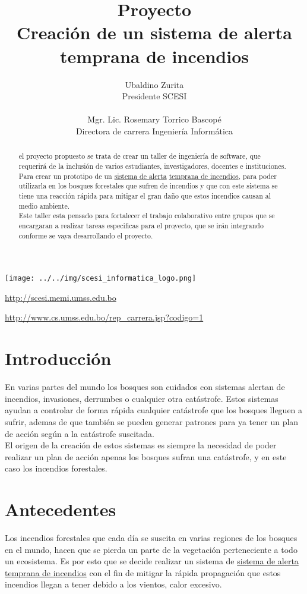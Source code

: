 \documentclass[letter,12pt]{article}
\title{Proyecto\\ Creación de un sistema de alerta temprana de incendios}
\author{Ubaldino Zurita\\{\normalsize Presidente SCESI}\\\\Mgr. Lic. Rosemary Torrico Bascopé\\{\normalsize Directora de carrera Ingeniería Informática}}
\begin{document}
\maketitle
\begin{center}
    \texttt{[image: ../../img/scesi\_informatica\_logo.png]} 
\end{center}
\begin{center}
    \url {http://scesi.memi.umss.edu.bo}\\
\end{center}
\begin{center}
    \url{http://www.cs.umss.edu.bo/rep_carrera.jsp?codigo=1}
\end{center}
\pagebreak
\tableofcontents
\pagebreak
\begin{abstract}
el proyecto propuesto se trata de crear un taller de ingeniería de software, que requerirá de la inclusión de varios estudiantes, investigadores, docentes e instituciones. Para crear un prototipo de un \underline{sistema de alerta} \underline{temprana de incendios}, para poder utilizarla en los bosques forestales que sufren de incendios y que con este sistema se tiene una reacción rápida para mitigar el gran daño que estos incendios causan al medio ambiente.\\
Este taller esta pensado para fortalecer el trabajo colaborativo entre grupos que se encargaran a realizar tareas especificas para el proyecto, que se irán integrando conforme se vaya desarrollando el proyecto.
\end{abstract}
\pagebreak

\section{Introducci\'on}
En varias partes del mundo los bosques son cuidados con sistemas alertan de incendios, invasiones, derrumbes o cualquier otra catástrofe. Estos sistemas ayudan a controlar de forma rápida cualquier catástrofe que los bosques lleguen a sufrir, ademas de que también se pueden generar patrones para ya tener un plan de acción según a la catástrofe suscitada.\\
El origen de la creación de estos sistemas es siempre la necesidad de poder realizar un plan de acción apenas los bosques sufran una catástrofe, y en este caso los incendios forestales.
\section{Antecedentes}
Los incendios forestales que cada día se suscita en varias regiones de los bosques en el mundo, hacen que se pierda un parte de la vegetación perteneciente a todo un ecosistema. Es por esto que se decide realizar un sistema de \underline{sistema de alerta temprana de incendios} con el fin de mitigar la rápida propagación que estos incendios llegan a tener debido a los vientos, calor excesivo. 
\end{document}

